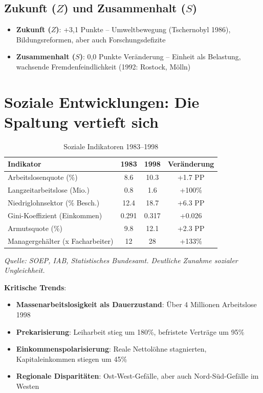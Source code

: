 \subsection{Zukunft (\(Z\)) und Zusammenhalt (\(S\))}

\begin{itemize}
    \item \textbf{Zukunft (\(Z\))}: +3,1 Punkte – Umweltbewegung (Tschernobyl 1986), Bildungsreformen, aber auch Forschungsdefizite
    \item \textbf{Zusammenhalt (\(S\))}: 0,0 Punkte Veränderung – Einheit als Belastung, wachsende Fremdenfeindlichkeit (1992: Rostock, Mölln)
\end{itemize}

\section{Soziale Entwicklungen: Die Spaltung vertieft sich}

\begin{table}[ht]
    \centering
    \caption{Soziale Indikatoren 1983–1998}
    \label{tab:sozial_konsolidierung}
    \begin{tabular}{lccc}
        \toprule
        \textbf{Indikator} & \textbf{1983} & \textbf{1998} & \textbf{Veränderung} \\
        \midrule
        Arbeitslosenquote (\%) & 8.6 & 10.3 & +1.7 PP \\
        Langzeitarbeitslose (Mio.) & 0.8 & 1.6 & +100\% \\
        Niedriglohnsektor (\% Besch.) & 12.4 & 18.7 & +6.3 PP \\
        Gini-Koeffizient (Einkommen) & 0.291 & 0.317 & +0.026 \\
        Armutsquote (\%) & 9.8 & 12.1 & +2.3 PP \\
        Managergehälter (x Facharbeiter) & 12 & 28 & +133\% \\
        \bottomrule
    \end{tabular}
\end{table}

\begin{flushleft}
\footnotesize{\textit{Quelle: SOEP, IAB, Statistisches Bundesamt. Deutliche Zunahme sozialer Ungleichheit.}}
\end{flushleft}

\textbf{Kritische Trends}:

\begin{itemize}
    \item \textbf{Massenarbeitslosigkeit als Dauerzustand}: Über 4 Millionen Arbeitslose 1998
    \item \textbf{Prekarisierung}: Leiharbeit stieg um 180\%, befristete Verträge um 95\%
    \item \textbf{Einkommenspolarisierung}: Reale Nettolöhne stagnierten, Kapitaleinkommen stiegen um 45\%
    \item \textbf{Regionale Disparitäten}: Ost-West-Gefälle, aber auch Nord-Süd-Gefälle im Westen
\end{itemize}

